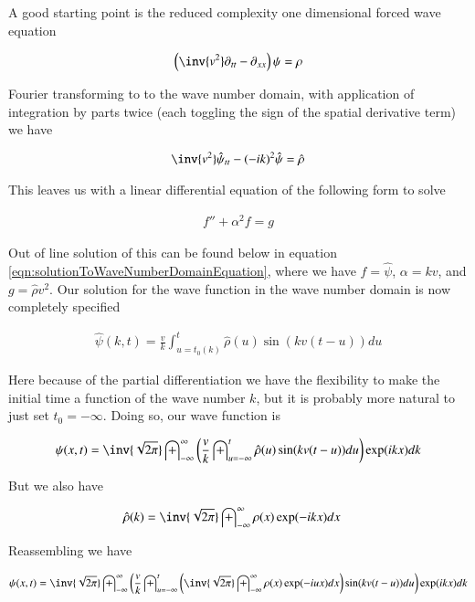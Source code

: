 \documentclass{article}
\newcommand{\IIinf}[0]{ \int_{-\infty}^\infty }
\begin{document}
A good starting point is the reduced complexity one dimensional forced
wave equation

\begin{align}
\left( \inv{v^2} \partial_{tt} -\partial_{xx} \right)\psi = \rho
\end{align}

Fourier transforming to to the wave number domain, with application of integration by parts twice (each toggling the sign of the spatial 
derivative term) we have

\begin{align*}
\inv{v^2}\hat{\psi}_{tt} - (-i k)^2 \hat{\psi} = \hat{\rho}
\end{align*}

This leaves us with a linear differential equation of the following form to solve

\begin{align}\label{eqn:waveNumEquationToSolve}
f'' + \alpha^2 f = g
\end{align}

Out of line solution of this can be found below in equation \ref{eqn:solutionToWaveNumberDomainEquation}, where we have
$f = \hat{\psi}$, $\alpha = k v$, and $g = \hat{\rho} v^2$.  Our solution for the wave function in the wave number domain is now completely
specified

\begin{align*}
\hat{\psi}(k, t) = \frac{v}{k} \int_{u=t_0(k)}^t \hat{\rho}(u) \sin( k v (t-u) ) du
\end{align*}

Here because of the partial differentiation we have the flexibility to make the initial time a function of the wave number $k$, but it is probably
more natural to just set $t_0 = -\infty$.  Doing so, our wave function is

\begin{align*}
{\psi}(x, t) 
&= 
\inv{\sqrt{2\pi}} \IIinf
\left( \frac{v}{k} \int_{u = -\infty}^t \hat{\rho}(u) \sin( k v (t-u) ) du \right) \exp( i k x ) dk \\
\end{align*}

But we also have

\begin{align*}
\hat{\rho}(k) &= \inv{\sqrt{2\pi}} \int_{-\infty}^\infty {\rho}(x) \exp( -i k x ) dx
\end{align*}

Reassembling we have

\begin{align*}
{\psi}(x, t) 
&= 
\inv{\sqrt{2\pi}} \IIinf
\left( \frac{v}{k} \int_{u = -\infty}^t 
\left(
\inv{\sqrt{2\pi}} \int_{-\infty}^\infty {\rho}(x) \exp( -i u x ) dx
\right)
\sin( k v (t-u) ) du \right) \exp( i k x ) dk \\
\end{align*}
\end{document}
